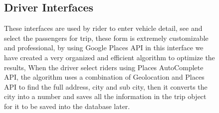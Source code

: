\begin{figure}
\subsection{Driver Interfaces}
These interfaces are used by rider to enter vehicle detail, see and select the passengers for trip, these form is extremely customizable and professional, by using Google Places API in this interface we have created a very organized and efficient algorithm to optimize the results, When the driver select riders using Places AutoComplete API, the algorithm uses a combination of Geolocation and Places API to find the full address, city and sub city, then it converts the city into a number and saves all the information in the trip object for it to be saved into the database later.
\hspace*{\fill}
\hfill 
{}
\hspace*{\fill}\\
\hspace*{\fill}
\hfill 
{}
\hspace*{\fill}
\end{figure}

\begin{figure}
\hspace*{\fill}
\hfill 
{}
\hspace*{\fill}
\end{figure}

\begin{figure}
\centering
{}
\end{figure}